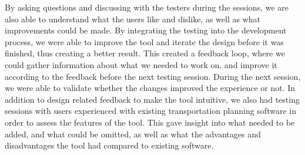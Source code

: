     By asking questions and discussing with the testers during the sessions, we are also able to understand what the users like and dislike, as well as what improvements could be made. By integrating the testing into the development process, we were able to improve the tool and iterate the design before it was finished, thus creating a better result. This created a feedback loop, where we could gather information about what we needed to work on, and improve it according to the feedback before the next testing session. During the next session, we were able to validate whether the changes improved the experience or not. In addition to design related feedback to make the tool intuitive, we also had testing sessions with users experienced with existing transportation planning software in order to assess the features of the tool. This gave insight into what needed to be added, and what could be omitted, as well as what the advantages and disadvantages the tool had compared to existing software.